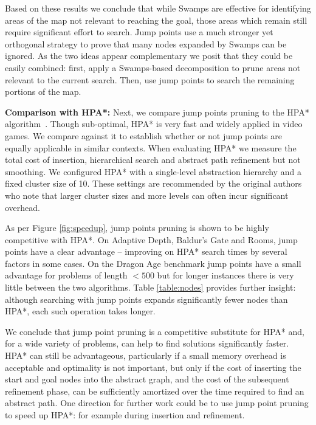 Based on these results we conclude that while Swamps are effective for
identifying areas of the map not relevant to reaching the goal, those areas
which remain still require significant effort to search.  Jump points use a much
stronger yet orthogonal strategy to prove that many nodes expanded by Swamps can
be ignored.  As the two ideas appear complementary we posit that they could be
easily combined: first, apply a Swamps-based decomposition to prune areas not
relevant to the current search.  Then, use jump points to search the remaining
portions of the map.

\textbf{Comparison with HPA*: }
Next, we compare jump points pruning to the HPA* algorithm~\cite{botea04}.
Though sub-optimal, HPA* is very fast and widely applied in video games. We
compare against it to establish whether or not jump points are equally
applicable in similar contexts.  When evaluating HPA* we measure the total cost
of insertion, hierarchical search and abstract path refinement but not
smoothing.  We configured HPA* with a single-level abstraction hierarchy and a
fixed cluster size of 10.  These settings are recommended by the original
authors who note that larger cluster sizes and more levels can often incur
significant overhead.

As per Figure \ref{fig:speedup}, jump points pruning is shown to be 
highly competitive with HPA*.
On Adaptive Depth, Baldur's Gate and Rooms, jump points have a clear advantage
-- improving on HPA* search times by several factors in some cases.
On the Dragon Age benchmark jump points have a small advantage for problems of 
length $< 500$ but for longer instances there is very little between the two
algorithms.
Table \ref{table:nodes} provides further insight: although searching with jump 
points expands significantly fewer nodes than HPA*, each such operation
takes longer.

We conclude that jump point pruning is a competitive substitute for HPA* and,
for a wide variety of problems, can help to find solutions significantly faster.
HPA*
can still be advantageous, particularly if a small memory overhead is acceptable
and optimality is not important, but only if the cost of inserting the start and
goal nodes into the abstract graph, and the cost of the subsequent refinement
phase, can be sufficiently amortized over the time required to find an abstract
path.
One direction for further work could be to use jump
point pruning to speed up HPA*: for example during insertion and refinement.
